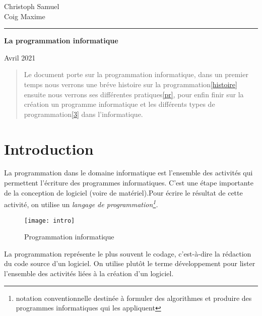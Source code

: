 \documentclass[12pt,a4paper]{article}
\begin{document}
\begin{titlepage}
 \selectfont
 \begin{flushright}\LARGE
   Christoph Samuel\\Coig Maxime
 \end{flushright}
 \hrule
 \begin{flushleft}\huge\bfseries
   La programmation informatique
 \end{flushleft}
 \begin{center}
    Avril 2021
 \end{center}
\end{titlepage}
\addto\captionsfrench{\renewcommand{\abstractname}{La programmation 
informatique}}
\setcounter{tocdepth}{3}
\clearpage
 \tableofcontents
 \listoffigures
 \listoftables
\vspace{2,5cm}
\begin{abstract}
 Le document porte sur la programmation informatique, dans un premier temps nous
 verrons une bréve histoire sur la programmation\ref{histoire} ensuite nous 
 verrons ses différentes pratiques\ref{pr}, pour enfin finir sur la création un 
 programme informatique et les différents types de programmation\ref{3} dans 
 l'informatique.
\end{abstract}
\newpage
\section{Introduction}
La programmation dans le domaine informatique est l'ensemble des 
activités qui permettent l'écriture des programmes informatiques. 
C'est une étape importante de la conception de logiciel (voire de 
matériel).Pour écrire le résultat de cette activité, on 
utilise un \textit{langage de programmation\footnote{
notation conventionnelle destinée à formuler des algorithmes et 
produire des programmes informatiques qui les appliquent}.}\\
\begin{figure}[!h]
 \centering
  \texttt{[image: intro]}
  \caption{Programmation informatique}
  \label{fig:introduction}
\end{figure}

La programmation représente le plus souvent le codage, c’est-à-dire 
la rédaction du code source d'un logiciel. On utilise plutôt le 
terme développement pour lister l'ensemble des activités liées 
à la création d'un logiciel.
\end{document}
